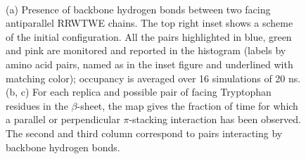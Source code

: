 \begin{figure}[p]
\centering
{} \\
\bigskip
{} \hspace{0.2cm}
\caption[Hydrogen bonds and $\pi$-stacking in a RRWTWE $\beta$-sheet]{(a) Presence of backbone hydrogen bonds between two facing antiparallel RRWTWE chains. The top right inset shows a scheme of the initial configuration. All the pairs highlighted in blue, green and pink are monitored and reported in the histogram (labels by amino acid pairs, named as in the inset figure and underlined with matching color); occupancy is averaged over 16 simulations of 20 ns. (b, c) For each replica and possible pair of facing Tryptophan residues in the $\beta$-sheet, the map gives the fraction of time for which a parallel or perpendicular $\pi$-stacking interaction has been observed. The second and third column correspond to pairs interacting by backbone hydrogen bonds.}
\label{fig:hb_beta_SIhere}
\end{figure}

